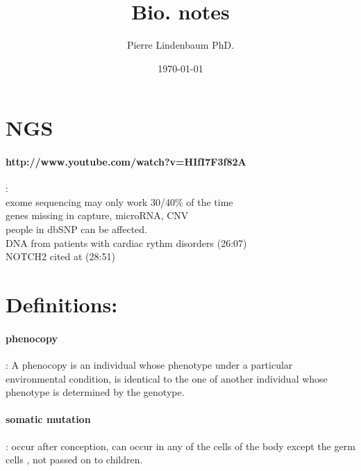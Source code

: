 \documentclass[12pt]{article}
\title{Bio. notes}
\author{Pierre Lindenbaum PhD.}
\date{\today}
\begin{document}
\maketitle
\section{NGS}
\paragraph{http://www.youtube.com/watch?v=HIfI7F3f82A}:\\

exome sequencing may only work 30/40\% of the time\\
genes missing in capture, microRNA, CNV\\
people in dbSNP can be affected.\\
DNA from patients with cardiac rythm disorders (26:07) \\
NOTCH2 cited at (28:51)\\

\section{Definitions:}
\paragraph{phenocopy}: A phenocopy is an individual whose phenotype under a particular environmental condition, is identical to the one of another individual whose phenotype is determined by the genotype.
\paragraph{somatic mutation}: occur after conception, can occur in any of the cells of the body except the germ cells , not passed on to children.
\end{document}
